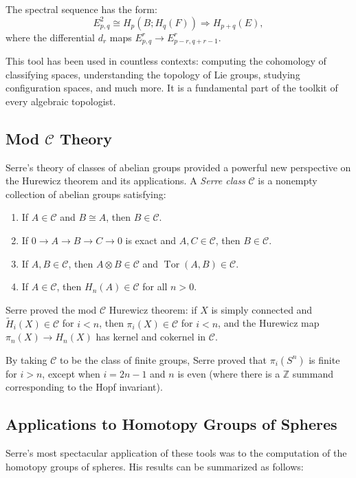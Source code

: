 The spectral sequence has the form:
\[
E^2_{p,q} \cong H_p(B; H_q(F)) \Rightarrow H_{p+q}(E),
\]
where the differential $d_r$ maps $E^r_{p,q} \to E^r_{p-r, q+r-1}$.

This tool has been used in countless contexts: computing the cohomology of classifying spaces, understanding the topology of Lie groups, studying configuration spaces, and much more. It is a fundamental part of the toolkit of every algebraic topologist.

\subsection{Mod \texorpdfstring{$\mathcal{C}$}{C} Theory}

Serre's theory of classes of abelian groups provided a powerful new perspective on the Hurewicz theorem and its applications. A \emph{Serre class} $\mathcal{C}$ is a nonempty collection of abelian groups satisfying:

\begin{enumerate}
\item If $A \in \mathcal{C}$ and $B \cong A$, then $B \in \mathcal{C}$.
\item If $0 \to A \to B \to C \to 0$ is exact and $A, C \in \mathcal{C}$, then $B \in \mathcal{C}$.
\item If $A, B \in \mathcal{C}$, then $A \otimes B \in \mathcal{C}$ and $\operatorname{Tor}(A, B) \in \mathcal{C}$.
\item If $A \in \mathcal{C}$, then $H_n(A) \in \mathcal{C}$ for all $n > 0$.
\end{enumerate}

Serre proved the mod $\mathcal{C}$ Hurewicz theorem: if $X$ is simply connected and $\tilde H_i(X) \in \mathcal{C}$ for $i < n$, then $\pi_i(X) \in \mathcal{C}$ for $i < n$, and the Hurewicz map $\pi_n(X) \to H_n(X)$ has kernel and cokernel in $\mathcal{C}$.

By taking $\mathcal{C}$ to be the class of finite groups, Serre proved that $\pi_i(S^n)$ is finite for $i > n$, except when $i = 2n-1$ and $n$ is even (where there is a $\mathbb{Z}$ summand corresponding to the Hopf invariant).

\subsection{Applications to Homotopy Groups of Spheres}

Serre's most spectacular application of these tools was to the computation of the homotopy groups of spheres. His results can be summarized as follows:


